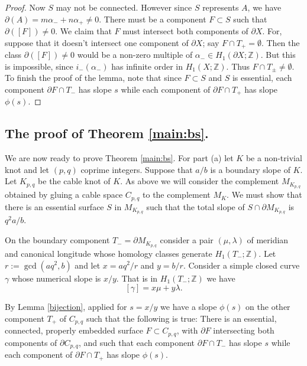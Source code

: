 \documentclass[11pt]{amsart}
\theoremstyle{definition}
\newcommand{\ZZ}{{\mathbb{Z}}}
\newcommand{\M}{M_{K_{p,q}}}
\newcommand{\C}{{C_{p, q}}}
\newcommand{\K}{{K_{p, q}}}
\begin{document}
\begin{proof}
Now $S$ may not be connected. However since $S$ represents $A$, we have $\partial(A)= m\alpha_{-} + n\alpha_{+}\neq 0$. There must be a component $F\subset S$ such that $\partial([F])\neq 0$. We claim that $F$ must intersect both components of $\partial X$.
For, suppose that it doesn't intersect one component of $\partial X$; say $F\cap T_{+}=\emptyset$. Then the class
$\partial([F])\neq 0$ would be a non-zero multiple of $\alpha_{-} \in H_1(\partial X;  \ZZ)$. But this is impossible, since
$i_{-}(\alpha_{-})$ has infinite order in $H_1( X;  \ZZ)$.
Thus $F\cap T_{\pm}\neq \emptyset$. To finish the proof of the lemma, note that since $F\subset S$ and $S$ is essential, each component $\partial F\cap T_{-}$ has slope $s$ while each component of $\partial F\cap T_{+}$ has slope $\phi(s)$.
\end{proof}




\subsection{The proof of Theorem \ref{main:bs}.} We are now ready to  prove Theorem \ref{main:bs}. For part (a) let $K$ be a non-trivial knot and let  $(p, q)$ coprime  integers.
 Suppose that  $a/b$ is a boundary slope of $K$.
Let $\K$ be the cable knot
of $K$. As above we will consider the complement $\M$ obtained by gluing a cable space $\C$  to the complement $M_K$.
We must show that there is an essential surface $S$ in $\M$ such that the total slope of $S\cap \partial \M$ is $q^2a/b$.


On the boundary component $T_{-}=\partial M_{\K}$  consider a pair  $(\mu,  \lambda)$ of meridian and canonical longitude
whose homology classes generate $H_1(T_{-}; \ZZ)$. Let  
$r := \gcd(aq^2, b)$ and let
$x= a q^2 /r$ and $y=b/r$.
Consider
a simple closed curve $\gamma$ whose numerical slope is $x/y$. That is in $H_1(T_{-}; \ZZ)$ we have
$$[\gamma]= x\mu+ y\lambda.$$

 By Lemma \ref{bijection}, applied for  $s=x/y$ we have  a slope $\phi(s)$ 
on the other component  $T_{+}$ of $\C$ such that the following is true: There is an essential, connected,  properly embedded surface $F\subset \C$, with  $\partial F$ intersecting both components of $\partial \C$,
and such that each component $\partial F\cap T_{-}$ has slope $s$ while each component of $\partial F\cap T_{+}$ has slope $\phi(s)$.
\end{document}
